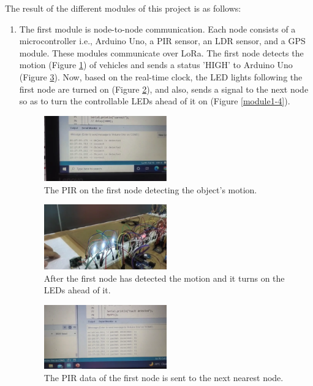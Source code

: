 \documentclass[11pt, oneside]{article}   	%
\begin{document}
The result of the different modules of this project is as follows: 
\begin{enumerate}
  \item The first module is node-to-node communication. Each node consists of a microcontroller i.e., Arduino Uno, a PIR sensor, an  LDR sensor, and a GPS module. These modules communicate over LoRa. The first node detects the motion (Figure \ref{module1-1}) of vehicles and sends a status 'HIGH' to Arduino Uno (Figure \ref{module1-3}). Now, based on the real-time clock, the LED lights following the first node are turned on (Figure \ref{module1-2}), and also, sends a signal to the next node so as to turn the controllable LEDs ahead of it on (Figure \ref{module1-4}).
  
  
  \begin{figure}[!ht]
  \centering
  \includegraphics[width=0.5\textwidth]{images/module1-1.png}
  \caption{The PIR on the first node detecting the object's motion.}
  \label{module1-1}
  \end{figure}
  
  \begin{figure}[!ht]
  \centering
  \includegraphics[width=0.5\textwidth]{images/module1-2.png}
  \caption{After the first node has detected the motion and it turns on the LEDs ahead of it.}
  \label{module1-2}
  \end{figure}
  
  \begin{figure}[!ht]
  \centering
  \includegraphics[width=0.5\textwidth]{images/module1-3.png}
  \caption{The PIR data of the first node is sent to the next nearest node. }
  \label{module1-3}
  \end{figure}
  

\end{enumerate}
\end{document}
